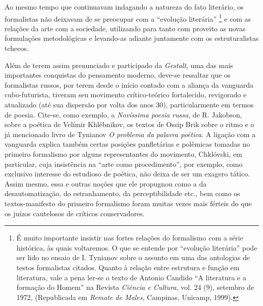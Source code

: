 Ao mesmo tempo que continuavam indagando a natureza do fato literário,
os formalistas não deixavam de se preocupar com a ``evolução literária''
\footnote{É muito importante insistir nas fortes relações do formalismo
  com a série histórica, às quais voltaremos. O que se entende por
  ``evolução literária'' pode ser lido no ensaio de I. Tynianov sobre o
  assunto em uma das antologias de testos formalistas citados. Quanto à
  relação entre estrutura e função em literatura, vale a pena ler-se o
  texto de Antonio Candido ``A literatura e a formação do Homem'' na
  Revista \emph{Ciência e Cultura}, vol. 24 (9), setembro de 1972,
  (Republicada em \emph{Remate de Males}, Campinas, Unicamp, 1999).} e
com as relações da arte com a sociedade, utilizando para tanto com
proveito as novas formulações metodológicas e levando-as adiante
juntamente com os estruturalistas tchecos.

Além de terem assim prenunciado e participado da \emph{Gestalt}, uma das
mais importantes conquistas do pensamento moderno, deve-se ressaltar que
os formalistas russos, por terem desde o início contado com a aliança da
vanguarda cubo-futurista, tiveram seu movimento crítico-teórico
fortalecido, revigorado e atualizado (até sua dispersão por volta dos
anos 30), particularmente em termos de poesia. Cite-se, como exemplo, a
\emph{Novíssima poesia russa}, de R. Jakobson, sobre a poética de
Velímir Khlébnikov, os textos de Ossip Brik sobre o ritmo e o já
mencionado livro de Tynianov \emph{O problema da palavra poética}. A
ligação com a vanguarda explica também certas posições panfletárias e
polêmicas tomadas no primeiro formalismo por alguns representantes do
movimento, Chklóvski, em particular, cuja insistência na ``arte como
procedimento'', por exemplo, como exclusivo interesse do estudioso de
poética, não deixa de ser um exagero tático. Assim mesmo, essa e outras
noções que ele propugnou como a da desautomatização, do estranhamento,
da perceptibilidade etc., bem como os textos-manifesto do primeiro
formalismo foram muitas vezes mais férteis do que os juízos cautelosos
de críticos conservadores.

